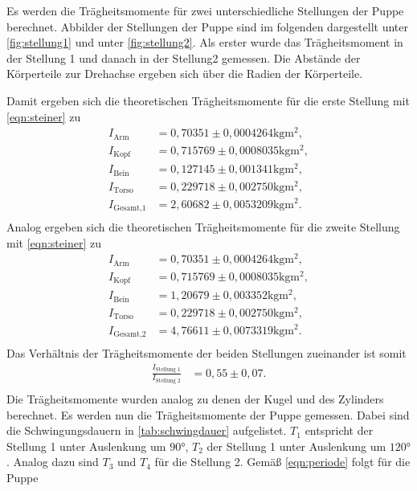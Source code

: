 Es werden die Trägheitsmomente für zwei unterschiedliche Stellungen der Puppe berechnet. Abbilder der Stellungen der Puppe sind im folgenden
dargestellt unter \autoref{fig:stellung1} und unter \autoref{fig:stellung2}. 
Als erster wurde das Trägheitsmoment in der Stellung 1 und danach in der Stellung2 gemessen.
Die Abstände der Körperteile zur Drehachse ergeben sich über die Radien der Körperteile.

Damit ergeben sich die theoretischen Trägheitsmomente für die erste Stellung  mit \autoref{eqn:steiner} zu
\begin{align*}
  I_{\text{Arm}} &= 0,70351 \pm 0,0004264 \si{\kilogram\meter^2}, \\
  I_{\text{Kopf}} &= 0,715769 \pm 0,0008035 \si{\kilogram\meter^2}, \\
  I_{\text{Bein}} &= 0,127145 \pm 0,001341\si{\kilogram\meter^2}, \\
  I_{\text{Torso}} &= 0,229718 \pm 0,002750 \si{\kilogram\meter^2}, \\
  I_{\text{Gesamt,1}} &= 2,60682 \pm 0,0053209 \si{\kilogram\meter^2}. \\
\end{align*}
Analog ergeben sich die theoretischen Trägheitsmomente für die zweite Stellung mit \autoref{eqn:steiner} zu
\begin{align*}
  I_{\text{Arm}} &= 0,70351 \pm 0,0004264 \si{\kilogram\meter^2}, \\
  I_{\text{Kopf}} &= 0,715769 \pm 0,0008035 \si{\kilogram\meter^2}, \\
  I_{\text{Bein}} &= 1,20679 \pm 0,003352 \si{\kilogram\meter^2}, \\ 
  I_{\text{Torso}} &= 0,229718 \pm 0,002750 \si{\kilogram\meter^2}, \\
  I_{\text{Gesamt,2}} &= 4,76611 \pm 0,0073319 \si{\kilogram\meter^2}. \\
\end{align*}
Das Verhältnis der Trägheitsmomente der beiden Stellungen zueinander ist somit
\begin{align*}
  \frac{I_{\text{Stellung 1}}}{I_{\text{Stellung 2}}} &= 0,55\pm 0,07.  \\
\end{align*}
Die Trägheitsmomente wurden analog zu denen der Kugel und des Zylinders berechnet. 
Es werden nun die Trägheitsmomente der Puppe gemessen.
Dabei sind die Schwingungsdauern in \autoref{tab:schwingdauer} aufgelistet.
$T_1$ entspricht der Stellung 1 unter Auslenkung um $90°$, $T_2$ der Stellung 1 unter Auslenkung um $120°$.
Analog dazu sind $T_3$ und $T_4$ für die Stellung 2. Gemäß \autoref{eqn:periode} folgt für die Puppe

